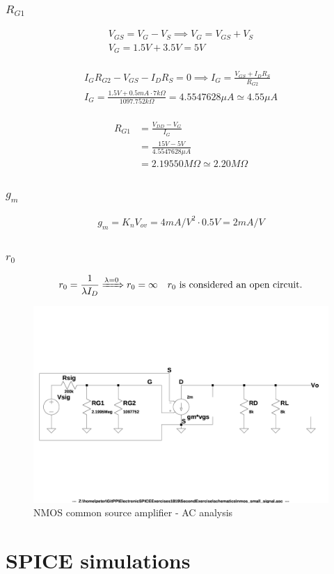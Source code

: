 \documentclass[10pt,a4paper]{book}
\begin{document}
\subsection{$R_{G1}$}
\begin{align}
V_{GS} = V_G - V_S \implies
V_G = V_{GS} + V_S\\
V_G = 1.5V + 3.5V = 5V\\
\end{align}

\begin{align}
I_G R_{G2} - V_{GS} - I_D R_S = 0 \implies
I_G = \frac{V_{GS}+I_D R_S}{R_{G2}}\\
I_G = \frac{1.5V + 0.5mA \cdot 7k\Omega}{1097.752k\Omega} = 4.5547628\mu A \simeq 4.55 \mu A\\
\end{align}

\begin{align}
R_{G1} &= \frac{V_{DD} - V_G}{I_G}\\
&= \frac{15V - 5V}{4.5547628 \mu A}\\
&=2.19550 M\Omega \simeq 2.20 M\Omega
\end{align}

\subsection{$g_m$}
\begin{align}
g_m = K_n V_{ov} = 4 mA/V^2 \cdot 0.5V = 2 mA/V
\end{align}

\subsection{$r_0$}
\begin{gather}
r_0 = \frac{1}{\lambda I_D} \xRightarrow{\lambda = 0} r_0 = \infty  \quad r_0 \text{ is considered an open circuit.}\\
\end{gather}

\begin{figure}[h]
  \centering
  \includegraphics[width=12cm]{schematics/nmos_small_signal.jpg}
  \caption{NMOS common source amplifier - AC analysis}
  \label{nmos_AC}
\end{figure}


\chapter{SPICE simulations}
\end{document}
